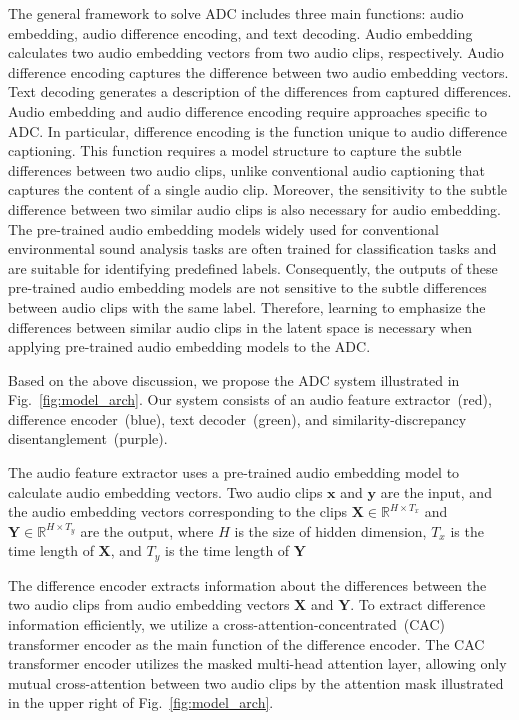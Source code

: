 The general framework to solve ADC includes three main functions: audio embedding, audio difference encoding, and text decoding.
Audio embedding calculates two audio embedding vectors from two audio clips, respectively.
Audio difference encoding captures the difference between two audio embedding vectors.
Text decoding generates a description of the differences from captured differences.
Audio embedding and audio difference encoding require approaches specific to ADC.
In particular, difference encoding is the function unique to audio difference captioning.
This function requires a model structure to capture the subtle differences between two audio clips, unlike conventional audio captioning that captures the content of a single audio clip.
Moreover, the sensitivity to the subtle difference between two similar audio clips is also necessary for audio embedding.
The pre-trained audio embedding models widely used for conventional environmental sound analysis tasks are often trained for classification tasks and are suitable for identifying predefined labels.
Consequently, the outputs of these pre-trained audio embedding models are not sensitive to the subtle differences between audio clips with the same label.
Therefore, learning to emphasize the differences between similar audio clips in the latent space is necessary when applying pre-trained audio embedding models to the ADC.

Based on the above discussion, we propose the ADC system illustrated in Fig.~\ref{fig:model_arch}.
Our system consists of an audio feature extractor~(red), difference encoder~(blue), text decoder~(green), and similarity-discrepancy disentanglement~(purple).

The audio feature extractor uses a pre-trained audio embedding model to calculate audio embedding vectors.
Two audio clips $\boldsymbol{x}$ and $\boldsymbol{y}$ are the input, and the audio embedding vectors corresponding to the clips $\boldsymbol{X} \in \mathbb{R}^{H \times T_x}$ and $\boldsymbol{Y} \in \mathbb{R}^{H \times T_y}$ are the output, where $H$ is the size of hidden dimension, $T_x$ is the time length of $\boldsymbol{X}$, and $T_y$ is the time length of $\boldsymbol{Y}$

The difference encoder extracts information about the differences between the two audio clips from audio embedding vectors $\boldsymbol{X}$ and $\boldsymbol{Y}$.
To extract difference information efficiently, we utilize a cross-attention-concentrated~(CAC) transformer encoder as the main function of the difference encoder.
The CAC transformer encoder utilizes the masked multi-head attention layer, allowing only mutual cross-attention between two audio clips by the attention mask illustrated in the upper right of Fig.~\ref{fig:model_arch}.


